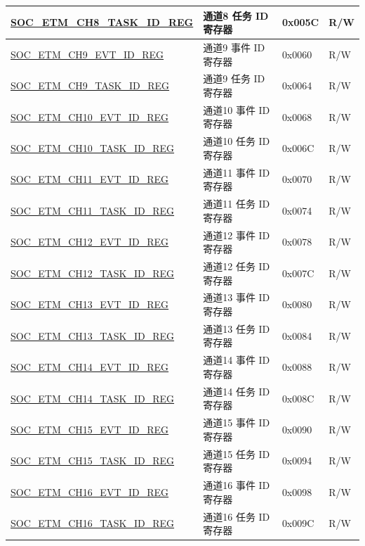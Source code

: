 \begin{longtable}{ | p{6cm} | p{6.2cm} | p{1.3cm} | p{2cm} | }
\hyperref[regdesc:SOCETMCHNTASKIDREG]{SOC\_ETM\_CH8\_TASK\_ID\_REG} & 通道8 任务 ID 寄存器 & 0x005C & R/W \\ \hline
\hyperref[regdesc:SOCETMCHNEVTIDREG]{SOC\_ETM\_CH9\_EVT\_ID\_REG} & 通道9 事件 ID 寄存器 & 0x0060 & R/W \\ \hline
\hyperref[regdesc:SOCETMCHNTASKIDREG]{SOC\_ETM\_CH9\_TASK\_ID\_REG} & 通道9 任务 ID 寄存器 & 0x0064 & R/W \\ \hline
\hyperref[regdesc:SOCETMCHNEVTIDREG]{SOC\_ETM\_CH10\_EVT\_ID\_REG} & 通道10 事件 ID 寄存器 & 0x0068 & R/W \\ \hline
\hyperref[regdesc:SOCETMCHNTASKIDREG]{SOC\_ETM\_CH10\_TASK\_ID\_REG} & 通道10 任务 ID 寄存器 & 0x006C & R/W \\ \hline
\hyperref[regdesc:SOCETMCHNEVTIDREG]{SOC\_ETM\_CH11\_EVT\_ID\_REG} & 通道11 事件 ID 寄存器 & 0x0070 & R/W \\ \hline
\hyperref[regdesc:SOCETMCHNTASKIDREG]{SOC\_ETM\_CH11\_TASK\_ID\_REG} & 通道11 任务 ID 寄存器 & 0x0074 & R/W \\ \hline
\hyperref[regdesc:SOCETMCHNEVTIDREG]{SOC\_ETM\_CH12\_EVT\_ID\_REG} & 通道12 事件 ID 寄存器 & 0x0078 & R/W \\ \hline
\hyperref[regdesc:SOCETMCHNTASKIDREG]{SOC\_ETM\_CH12\_TASK\_ID\_REG} & 通道12 任务 ID 寄存器 & 0x007C & R/W \\ \hline
\hyperref[regdesc:SOCETMCHNEVTIDREG]{SOC\_ETM\_CH13\_EVT\_ID\_REG} & 通道13 事件 ID 寄存器 & 0x0080 & R/W \\ \hline
\hyperref[regdesc:SOCETMCHNTASKIDREG]{SOC\_ETM\_CH13\_TASK\_ID\_REG} & 通道13 任务 ID 寄存器 & 0x0084 & R/W \\ \hline
\hyperref[regdesc:SOCETMCHNEVTIDREG]{SOC\_ETM\_CH14\_EVT\_ID\_REG} & 通道14 事件 ID 寄存器 & 0x0088 & R/W \\ \hline
\hyperref[regdesc:SOCETMCHNTASKIDREG]{SOC\_ETM\_CH14\_TASK\_ID\_REG} & 通道14 任务 ID 寄存器 & 0x008C & R/W \\ \hline
\hyperref[regdesc:SOCETMCHNEVTIDREG]{SOC\_ETM\_CH15\_EVT\_ID\_REG} & 通道15 事件 ID 寄存器 & 0x0090 & R/W \\ \hline
\hyperref[regdesc:SOCETMCHNTASKIDREG]{SOC\_ETM\_CH15\_TASK\_ID\_REG} & 通道15 任务 ID 寄存器 & 0x0094 & R/W \\ \hline
\hyperref[regdesc:SOCETMCHNEVTIDREG]{SOC\_ETM\_CH16\_EVT\_ID\_REG} & 通道16 事件 ID 寄存器 & 0x0098 & R/W \\ \hline
\hyperref[regdesc:SOCETMCHNTASKIDREG]{SOC\_ETM\_CH16\_TASK\_ID\_REG} & 通道16 任务 ID 寄存器 & 0x009C & R/W \\ \hline

\end{longtable}
